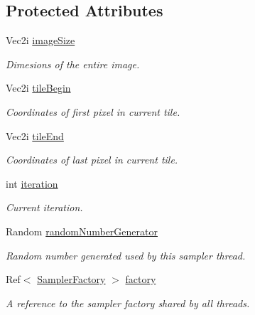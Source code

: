 \subsection*{Protected Attributes}
\begin{DoxyCompactItemize}
\item 
Vec2i \hyperlink{classembree_1_1_sampler_ab87a1a43193c03831de1c238b426531d}{imageSize}
\begin{DoxyCompactList}\small\item\em Dimesions of the entire image. \item\end{DoxyCompactList}\item 
Vec2i \hyperlink{classembree_1_1_sampler_abf235b415b0617f18908ab5488b14aab}{tileBegin}
\begin{DoxyCompactList}\small\item\em Coordinates of first pixel in current tile. \item\end{DoxyCompactList}\item 
Vec2i \hyperlink{classembree_1_1_sampler_aeab1cdc06154d519f670138ed5d16298}{tileEnd}
\begin{DoxyCompactList}\small\item\em Coordinates of last pixel in current tile. \item\end{DoxyCompactList}\item 
int \hyperlink{classembree_1_1_sampler_af6a3139e4ac5ef9e34b3e86c15164fb8}{iteration}
\begin{DoxyCompactList}\small\item\em Current iteration. \item\end{DoxyCompactList}\item 
Random \hyperlink{classembree_1_1_sampler_ac12f4b87473624b4927fbf8a0aa5c63f}{randomNumberGenerator}
\begin{DoxyCompactList}\small\item\em Random number generated used by this sampler thread. \item\end{DoxyCompactList}\item 
Ref$<$ \hyperlink{classembree_1_1_sampler_factory}{SamplerFactory} $>$ \hyperlink{classembree_1_1_sampler_a66d739c6b33ea75337cf3fb96c2b3cf5}{factory}
\begin{DoxyCompactList}\small\item\em A reference to the sampler factory shared by all threads. \item\end{DoxyCompactList}\item 

\end{DoxyCompactItemize}
